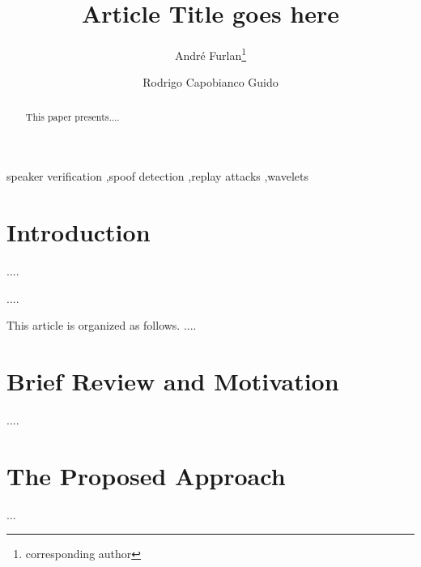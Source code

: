 \documentclass[3p,times]{elsarticle}
\begin{document}
\begin{frontmatter}
\vspace*{-40pt}
\title{Article Title goes here}
\author[a1,a2]{Andr\'{e} Furlan\footnote{corresponding author}}
\author[a1]{Rodrigo Capobianco Guido}
\address[a1]{Instituto de Bioci\^{e}ncias, Letras e Ci\^{e}ncias Exatas, Unesp - Univ Estadual Paulista (S\~{a}o Paulo State University), Rua Crist\'{o}v\~{a}o Colombo 2265, Jd Nazareth, 15054-000, S\~{a}o Jos\'{e} do Rio Preto - SP, Brazil.}
\address[a2]{Centro Paula Souza, São Paulo, SP, Brazil.}
\begin{abstract}
This paper presents....   
\end{abstract}
\begin{keyword}
speaker verification \sep spoof detection \sep replay attacks \sep wavelets
\end{keyword}
\end{frontmatter}
\vspace*{+5pt}
\section{Introduction}
\par ....
\\
\par ....
\\
\par This article is organized as follows. ....
\section{Brief Review and Motivation}
\label{review}
\par ....
\section{The Proposed Approach}
\label{pa}
\par ...
\end{document}
